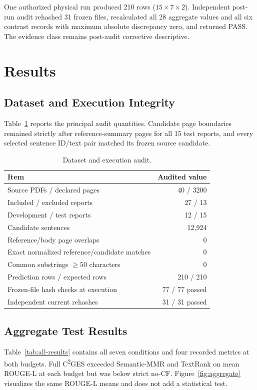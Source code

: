 \documentclass[applsci,article,submit,moreauthors]{Definitions/mdpi}
\newcommand{\cges}{C\textsuperscript{2}GES}
\begin{document}
One authorized physical run produced 210 rows ($15\times7\times2$). Independent post-run audit rehashed 31 frozen files, recalculated all 28 aggregate values and all six contrast records with maximum absolute discrepancy zero, and returned PASS. The evidence class remains post-audit corrective descriptive.

\section{Results}

\subsection{Dataset and Execution Integrity}

Table~\ref{tab:audit} reports the principal audit quantities. Candidate page boundaries remained strictly after reference-summary pages for all 15 test reports, and every selected sentence ID/text pair matched its frozen source candidate.

\begin{table}[H]
\caption{Dataset and execution audit.}
\label{tab:audit}\centering
\begin{tabular}{lr}
\toprule
Item & Audited value\\
\midrule
Source PDFs / declared pages & 40 / 3200\\
Included / excluded reports & 27 / 13\\
Development / test reports & 12 / 15\\
Candidate sentences & 12,924\\
Reference/body page overlaps & 0\\
Exact normalized reference/candidate matches & 0\\
Common substrings $\geq50$ characters & 0\\
Prediction rows / expected rows & 210 / 210\\
Frozen-file hash checks at execution & 77 / 77 passed\\
Independent current rehashes & 31 / 31 passed\\
\bottomrule
\end{tabular}
\end{table}

\subsection{Aggregate Test Results}

Table~\ref{tab:all-results} contains all seven conditions and four recorded metrics at both budgets. Full \cges{} exceeded Semantic-MMR and TextRank on mean ROUGE-L at each budget but was below strict no-CF. Figure~\ref{fig:aggregate} visualizes the same ROUGE-L means and does not add a statistical test.
\end{document}
